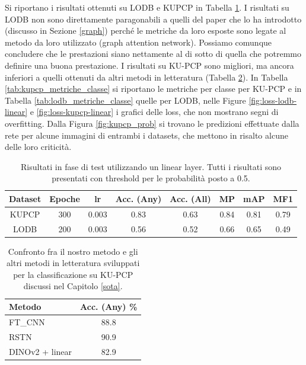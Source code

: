 Si riportano i risultati ottenuti su LODB e KUPCP in Tabella \ref{tab:linear_test}. I risultati su LODB non sono direttamente paragonabili a quelli del paper \cite{graph} che lo ha introdotto (discusso in Sezione \ref{graph}) perché le metriche da loro esposte sono legate al metodo da loro utilizzato (graph attention network). Possiamo comunque concludere che le prestazioni siano nettamente al di sotto di quella che potremmo definire una buona prestazione. I risultati su KU-PCP sono migliori, ma ancora inferiori a quelli ottenuti da altri metodi in letteratura (Tabella \ref{tab:kupcp_sota_comparison}). In Tabella \ref{tab:kupcp_metriche_classe} si riportano le metriche per classe per KU-PCP e in Tabella \ref{tab:lodb_metriche_classe} quelle per LODB, nelle Figure \ref{fig:loss-lodb-linear} e \ref{fig:loss-kupcp-linear} i grafici delle loss, che non mostrano segni di overfitting. Dalla Figura \ref{fig:kupcp_prob} si trovano le predizioni effettuate dalla rete per alcune immagini di entrambi i datasets, che mettono in risalto alcune delle loro criticità.

\vspace{5mm}
\begin{table}[h]
    \centering
    \setlength{\tabcolsep}{5pt} %
    \renewcommand{\arraystretch}{1.6} %
    \begin{tabular}{c|cc|ccccc}
         \hline
         Dataset & Epoche & lr & \textbf{Acc. (Any)} & \textbf{Acc. (All)} & \textbf{MP} & \textbf{mAP} & \textbf{MF1} \\
          \hline
          KUPCP & 300 & 0.003 & 0.83 & 0.63 & 0.84 & 0.81 & 0.79 \\
          LODB & 200 & 0.003 & 0.56 & 0.52 & 0.66 & 0.65 & 0.49 \\
          \hline
    \end{tabular}
    \caption{Risultati in fase di test utilizzando un linear layer. Tutti i risultati sono presentati con threshold per le probabilità posto a 0.5.}
    \label{tab:linear_test}
\end{table}

\vspace{5mm}
\begin{table}[h]
    \centering
    \setlength{\tabcolsep}{5pt} %
    \renewcommand{\arraystretch}{1.6} %
    \begin{tabular}{l|c}
         \hline
         \textbf{Metodo} & \textbf{Acc. (Any) \%} \\
         \hline
         FT\_CNN \cite{composition_dominant_geometric} &  88.8 \\
         RSTN \cite{spatial_invariant_cnn} & 90.9 \\
         DINOv2 + linear & 82.9 \\
          \hline
    \end{tabular}
    \caption{Confronto fra il nostro metodo e gli altri metodi in letteratura sviluppati per la classificazione su KU-PCP discussi nel Capitolo \ref{sota}.}
    \label{tab:kupcp_sota_comparison}
\end{table}

